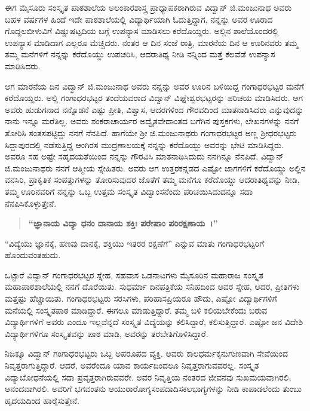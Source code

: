 {ಈಗ ಮೈಸೂರು ಸಂಸ್ಕೃತ ಪಾಠಶಾಲೆಯ ಅಲಂಕಾರಶಾಸ್ತ್ರ ಪ್ರಾಧ್ಯಾಪಕರಾಗಿರುವ ವಿದ್ವಾನ್ ಜಿ.ಮಂಜುನಾಥ ಅವರು ಬಹಳ ವರ್ಷಗಳ ಹಿಂದೆ ಇದೇ ಪಾಠಶಾಲೆಯಲ್ಲಿ ವಿದ್ಯಾರ್ಥಿಯಾಗಿ ಓದುತ್ತಿದ್ದಾಗ, ನನ್ನನ್ನು ಅವರ ಊರಾದ ಗೊದ್ದಲಬೀಳುವಿಗೆ ವಿಷ್ಣುಷಟ್ಪದಿಯ ಬಗ್ಗೆ ಉಪನ್ಯಾಸ ಮಾಡಿಸಲು ಕರೆದೊಯ್ದರು. ಅಲ್ಲಿನ ಶಾಲೆಯೊಂದರಲ್ಲಿ ಉಪನ್ಯಾಸ ಮಾಡಿದಾಗ ಎಲ್ಲರೂ ಮೆಚ್ಚಿದರು. ನಂತರ ಆ ದಿನ ಸಂಜೆ ರಾತ್ರಿ, ಮಾರನೆಯ ದಿನ ಆ ಊರಿನವರು ತಮ್ಮ ತಮ್ಮ ಮನೆಗಳಿಗೆ ನನ್ನನ್ನು ಕರೆದೊಯ್ದು ಉಪಚರಿಸಿ, ಆದರಾತಿಥ್ಯ ನೀಡಿ ನನ್ನಿಂದ ಮತ್ತೆ ಕೆಲವೆಡೆ ಉಪನ್ಯಾಸ ಮಾಡಿಸಿದರು. 

ಆಗ ಮಾರನೆಯ ದಿನ ವಿದ್ವಾನ್ ಜಿ.ಮಂಜುನಾಥ ಅವರು ನನ್ನನ್ನು ಅವರ ಊರಿನ ಬಳಿಯಿದ್ದ ಗಂಗಾಧರಭಟ್ಟರ ಮನೆಗೆ ಕರೆದೊಯ್ದರು. ಅಲ್ಲಿ ಗಂಗಾಧರಭಟ್ಟರ ತಂದೆಯವರಾದ ವಿದ್ವಾನ್ ವಿಘ್ನೇಶ್ವರಭಟ್ಟರನ್ನು ಪರಿಚಯ ಮಾಡಿಸಿದರು. ಆಗ ಅವರು ಹುಡುಗನಾದ ನನ್ನೊಡನೆ ಎಷ್ಟು ಪ್ರೀತಿ, ವಿಶ್ವಾಸ, ಆದರಗಳಿಂದ ಗೌರವದಿಂದ ಮಾತನಾಡಿಸಿದರು ಎನ್ನುವುದನ್ನು ನಾನು ಇನ್ನೂ ಮರೆತಿಲ್ಲ. ಅವರು ಶಂಕರಾಚಾರ್ಯರ ಅದ್ವೈತವೇದಾಂತದ ಬಗೆಗಿನ ಪುಸ್ತಕಗಳು, ಲೇಖನಗಳನ್ನು ನನಗೆ ತೋರಿಸಿ ಸಂತಸಪಟ್ಟಿದ್ದು ನನಗೆ ನೆನಪಿದೆ. ಹಾಗೆಯೇ ಶ್ರೀ ಜಿ.ಮಂಜುನಾಥರು ಗಂಗಾಧರಭಟ್ಟರ ಅಣ್ಣ ಶ್ರೀಧರಭಟ್ಟರು ಸಿದ್ದಾಪುರದಲ್ಲಿ ನಡೆಸುತ್ತಿದ್ದ ಆಂಗಿರಸ ಮುದ್ರಣಾಲಯಕ್ಕೆ ನನ್ನನ್ನು ಕರೆದೊಯ್ದು ಅವರನ್ನು ಭೇಟಿ ಮಾಡಿಸಿದ್ದರು. ಅವರೂ ಸಹ ಅಷ್ಟೇ ಸಹೃದಯತೆಯಿಂದ ನನ್ನನ್ನು ಗೌರವಿಸಿ ಮಾತನಾಡಿಸಿದುದು ನನಗಿನ್ನೂ ನೆನಪಿದೆ. ವಿದ್ವಾನ್ ಜಿ.ಮಂಜುನಾಥರು ನನಗೆ ಆತ್ಮೀಯ ಸ್ನೇಹಿತರು. ಅವರು ಆಗ ಉತ್ತರಕನ್ನಡದ ಎಷ್ಟೋ ಜಾಗಗಳಿಗೆ ಕರೆದೊಯ್ದು ಅಲ್ಲಿನ ವನಸಿರಿ, ಪ್ರಾಕೃತಿಕ ಸಂಪತ್ತುಗಳನ್ನು ತೋರಿಸುವುದರ ಜೊತೆಗೆ ತಮ್ಮ ಮನೆಗೂ ಕರೆದೊಯ್ದು ಆದರಾತಿಥ್ಯವನ್ನು ನೀಡಿ, ತಮ್ಮ ಊರಿನವರಿಗೆ ನನ್ನನ್ನು ಒಬ್ಬ ಉತ್ತಮ ಸಂಸ್ಕೃತ ವಿದ್ವಾಂಸನೆಂದು ಪರಿಚಯಿಸಿದುದನ್ನೂ ಸದಾ ನೆನಪಿಸಿಕೊಳ್ಳುತ್ತೇನೆ.
\begin{verse}
\textbf{“ಜ್ಞಾನಾಯ ವಿದ್ಯಾ ಧನಂ ದಾನಾಯ ಶಕ್ತಿಃ ಪರೇಷಾಂ ಪರಿರಕ್ಷಣಾಯ~।”}
\end{verse}
“ವಿದ್ಯೆಯು ಜ್ಞಾನಕ್ಕೆ, ಹಣವು ದಾನಕ್ಕೆ, ಶಕ್ತಿಯು ಇತರರ ರಕ್ಷಣೆಗೆ” ಎನ್ನುವ ಮಾತು ಗಂಗಾಧರಭಟ್ಟರಿಗೆ ಹೊಂದುವಂತಹುದು.

ಒಟ್ಟಾರೆ ವಿದ್ವಾನ್ ಗಂಗಾಧರಭಟ್ಟರ ಸ್ನೇಹ, ಸಹವಾಸ ಒಡನಾಟಗಳು ಮೈಸೂರಿನ ಮಹಾರಾಜ ಸಂಸ್ಕೃತ ಮಹಾಪಾಠಶಾಲೆಯಲ್ಲಿ ನನಗೆ ದೊರೆಯಿತು. ಸುಧರ್ಮಾ ದಿನಪತ್ರಿಕೆಯ ಸನಿಹದಿಂದ ಅವರ ಸ್ನೇಹ, ಆದರ, ಪ್ರೀತಿಗಳು ಮತ್ತಷ್ಟು ಹೆಚ್ಚಾಯಿತು. ಗಂಗಾಧರಭಟ್ಟರು ಸರಸಿಗಳು, ಪರಿಹಾಸಪ್ರಿಯರೂ ಹೌದು, ಎಷ್ಟೋ ವಿದ್ಯಾರ್ಥಿಗಳಿಗೆ ಮನೆಯಲ್ಲಿ ಸಂಸ್ಕೃತಪಾಠ ಮಾಡಿದ್ದಾರೆ. ಈಗಲೂ ಮಾಡುತ್ತಿದ್ದಾರೆ. ತಮ್ಮ ಬಳಿ ಕಲಿಯಬೇಕೆಂದು ಬರುವ ವಿದ್ಯಾರ್ಥಿಗಳಿಗೆ ಅವರು ಎಂದೂ ಇಲ್ಲವೆನ್ನದೆ ಸಂಸ್ಕೃತ ವಿದ್ಯೆಯನ್ನು ಕಲಿಸಿದ್ದಾರೆ, ಕಲಿಸುತ್ತಿದ್ದಾರೆ. ಎಷ್ಟೋ ಜನ ವಿದೇಶಿ ವಿದ್ಯಾರ್ಥಿಗಳಿಗೂ ಸಂಸ್ಕೃತವನ್ನು ಪಾಠ ಮಾಡಿ, ಅವರನ್ನು ತರಬೇತಿಗೊಳಿಸಿದ್ದಾರೆ. 

ನಿಜಕ್ಕೂ ವಿದ್ವಾನ್ ಗಂಗಾಧರಭಟ್ಟರು ಒಬ್ಬ ಅಪರೂಪದ ವ್ಯಕ್ತಿ. ಅವರು ಕಾಲಧರ್ಮಕ್ಕನುಗುಣವಾಗಿ ಸೇವೆಯಿಂದ ನಿವೃತ್ತರಾಗುತ್ತಿದ್ದಾರೆ. ಆದರೆ, ಅವರೆಂದೂ ಯಾವ ಕಾರ್ಯದಿಂದಲೂ ನಿವೃತ್ತರಾಗುವವರಲ್ಲ. ಸಂಸ್ಕೃತ ವಿದ್ಯಾಬೋಧನೆಯಲ್ಲಿ ಸದಾ ಪ್ರವೃತ್ತರಾಗಿರುವವರೇ. ಅವರ ನಿವೃತ್ತಿಯ ನಂತರದ ಜೀವನವು ಸುಖಮಯವಾಗಿರಲಿ, ಆನಂದವಾಗಿರಲಿ. ಅವರಿಗೆ ಭಗವಂತನು ಆಯುರಾರೋಗ್ಯಸಂಪದಾದಿಸಕಲಭಾಗ್ಯಗಳನ್ನು ನೀಡಿ ಕಾಪಾಡಲೆಂದು ತುಂಬು ಹೃದಯದಿಂದ ಹಾರೈಸುತ್ತೇನೆ.

\articleend
}
